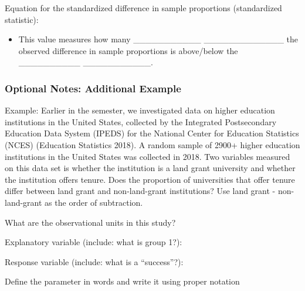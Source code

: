 \documentclass[
]{report}
\providecommand{\tightlist}{%
  \setlength{\itemsep}{0pt}\setlength{\parskip}{0pt}}
\begin{document}

Equation for the standardized difference in sample proportions (standardized statistic):

\vspace{0.8in}


\begin{itemize}
\tightlist
\item
  This value measures how many \_\_\_\_\_\_\_\_\_\_\_ \_\_\_\_\_\_\_\_\_\_\_\_\_ the observed difference in sample proportions is above/below the \_\_\_\_\_\_\_\_\_\_ \_\_\_\_\_\_\_\_\_\_\_.
\end{itemize}


\subsubsection*{Optional Notes: Additional Example}\label{optional-notes-additional-example-14}

Example: Earlier in the semester, we investigated data on higher education institutions in the United States, collected by the Integrated Postsecondary Education Data System (IPEDS) for the National Center for Education Statistics (NCES) (Education Statistics 2018). A random sample of 2900+ higher education institutions in the United States was collected in 2018. Two variables measured on this data set is whether the institution is a land grant university and whether the institution offers tenure. Does the proportion of universities that offer tenure differ between land grant and non-land-grant institutions? Use land grant - non-land-grant as the order of subtraction.

What are the observational units in this study?

\vspace{0.3in}

Explanatory variable (include: what is group 1?):

\vspace{0.2in}

Response variable (include: what is a ``success''?):

\vspace{0.2in}

Define the parameter in words and write it using proper notation

\vspace{0.5in}
\end{document}
